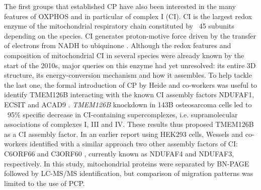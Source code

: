 The first groups that established CP have also been interested in the many features of OXPHOS and in particular of complex I (CI). CI is the largest redox enzyme of the mitochondrial respiratory chain constituted by ~45 subunits depending on the species. CI generates proton-motive force driven by the transfer of electrons from NADH to ubiquinone \cite{Hirst_2013}. Although the redox features and composition of mitochondrial CI in several species were already known by the start of the 2010s, major queries on this enzyme had yet unresolved: its entire 3D structure, its energy-conversion mechanism and how it assembles. To help tackle the last one, the formal introduction of CP by Heide and co-workers was useful to identify TMEM126B interacting with the known CI assembly factors NDUFAF1, ECSIT and ACAD9 \cite{Heide_2012}. \emph{TMEM126B} knockdown in 143B osteosarcoma cells led to ~95\% specific decrease in CI-containing supercomplexes, i.e. supramolecular associations of complexes I, III and IV. These results thus proposed TMEM126B as a CI assembly factor. In an earlier report using HEK293 cells, Wessels and co-workers identified with a similar approach two other assembly factors of CI: C6ORF66 and C3ORF60 \cite{Wessels_2009}, currently known as NDUFAF4 and NDUFAF3, respectively. In this study, mitochondrial proteins were separated by BN-PAGE followed by LC-MS/MS identification, but comparison of migration patterns was limited to the use of PCP.\\
